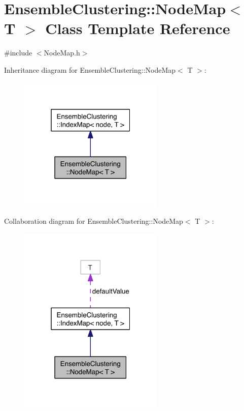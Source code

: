 \hypertarget{class_ensemble_clustering_1_1_node_map}{\section{Ensemble\-Clustering\-:\-:Node\-Map$<$ T $>$ Class Template Reference}
\label{class_ensemble_clustering_1_1_node_map}
}


{\ttfamily \#include $<$Node\-Map.\-h$>$}



Inheritance diagram for Ensemble\-Clustering\-:\-:Node\-Map$<$ T $>$\-:
\nopagebreak
\begin{figure}[H]
\begin{center}
\leavevmode
\includegraphics[width=196pt]{class_ensemble_clustering_1_1_node_map__inherit__graph}
\end{center}
\end{figure}


Collaboration diagram for Ensemble\-Clustering\-:\-:Node\-Map$<$ T $>$\-:
\nopagebreak
\begin{figure}[H]
\begin{center}
\leavevmode
\includegraphics[width=196pt]{class_ensemble_clustering_1_1_node_map__coll__graph}
\end{center}
\end{figure}
